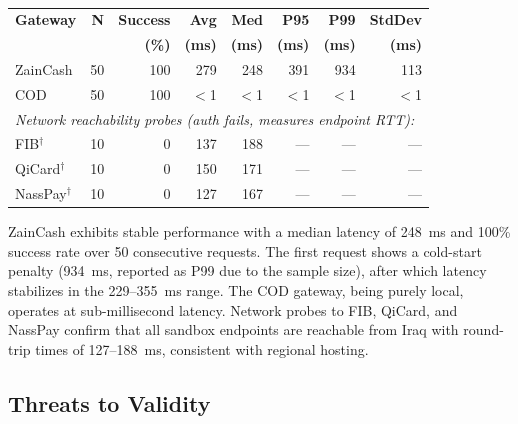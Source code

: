 \documentclass[10pt, a4paper, oneside]{article}
\begin{document}
\begin{table}[ht]
    \centering
    \setlength\tabcolsep{4pt}
    \small
    \begin{tabular}{lrrrrrrr}
        \toprule
        \bfseries Gateway & \bfseries N & \bfseries Success & \bfseries Avg & \bfseries Med & \bfseries P95 & \bfseries P99 & \bfseries StdDev \\
        & & \bfseries (\%) & \bfseries (ms) & \bfseries (ms) & \bfseries (ms) & \bfseries (ms) & \bfseries (ms) \\
        \midrule
        ZainCash & 50 & 100 & 279 & 248 & 391 & 934 & 113 \\
        COD & 50 & 100 & $<$1 & $<$1 & $<$1 & $<$1 & $<$1 \\
        \midrule
        \multicolumn{8}{l}{\itshape Network reachability probes (auth fails, measures endpoint RTT):} \\
        FIB$^\dagger$ & 10 & 0 & 137 & 188 & --- & --- & --- \\
        QiCard$^\dagger$ & 10 & 0 & 150 & 171 & --- & --- & --- \\
        NassPay$^\dagger$ & 10 & 0 & 127 & 167 & --- & --- & --- \\
        \bottomrule
    \end{tabular}
    \caption{\fontsize{10pt}{11pt}}
    \label{table:benchmarks}
\end{table}

ZainCash exhibits stable performance with a median latency of 248~ms and 100\% success rate over 50 consecutive requests. The first request shows a cold-start penalty (934~ms, reported as P99 due to the sample size), after which latency stabilizes in the 229--355~ms range. The COD gateway, being purely local, operates at sub-millisecond latency. Network probes to FIB, QiCard, and NassPay confirm that all sandbox endpoints are reachable from Iraq with round-trip times of 127--188~ms, consistent with regional hosting.

\subsection{Threats to Validity}
\end{document}
